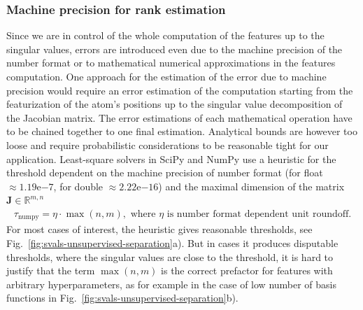 \subsubsection{Machine precision for rank estimation}
Since we are in control of the whole computation of the features up to the singular values, errors are introduced even due to the machine precision of the number format or to mathematical numerical approximations in the features computation.
One approach for the estimation of the error due to machine precision would require an error estimation of the computation starting from the featurization of the atom's positions up to the singular value decomposition of the Jacobian matrix.
The error estimations of each mathematical operation have to be chained together to one final estimation.
Analytical bounds are however too loose and require probabilistic considerations to be reasonable tight for our application\cite{huynh2011error}.
Least-square solvers in SciPy and NumPy use a heuristic for the threshold dependent on the machine precision of number format (for float $\approx1.19\mathrm{e}{-7}$, for double $\approx2.22\textrm{e}{-16}$) and the maximal dimension of the matrix $\mathbf{J}\in\mathbb{R}^{m,n}$
\begin{multline}
  \tau_\textrm{numpy} = \eta\cdot\max(n,m),\textrm{ where }\eta\textrm{ is number format dependent unit roundoff.}
\end{multline}
For most cases of interest, the heuristic gives reasonable thresholds, see Fig.~\ref{fig:svals-unsupervised-separation}a).
But in cases it produces disputable thresholds, where the singular values are close to the threshold, it is hard to justify that the term $\max(n,m)$ is the correct prefactor for features with arbitrary hyperparameters, as for example in the case of low number of basis functions in Fig.~\ref{fig:svals-unsupervised-separation}b).

